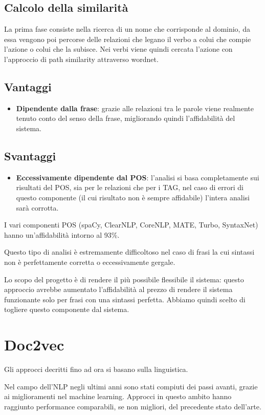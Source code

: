 \documentclass[twoside]{supsistudent}
\begin{document}
\subsection{Calcolo della similarità}
La prima fase consiste nella ricerca di un nome che corrisponde al dominio, da essa vengono poi percorse delle relazioni che legano il verbo a colui che compie l'azione o colui che la subisce. Nei verbi viene quindi cercata l'azione con l'approccio di path similarity attraverso wordnet.
\subsection{Vantaggi}
\begin{itemize}
  \item \textbf{Dipendente dalla frase}: grazie alle relazioni tra le parole viene realmente tenuto conto del senso della frase, migliorando quindi l'affidabilità del sistema.
\end{itemize}
\subsection{Svantaggi}
\begin{itemize}
  \item \textbf{Eccessivamente dipendente dal POS}: l'analisi si basa completamente sui risultati del POS, sia per le relazioni che per i TAG, nel caso di errori di questo componente (il cui risultato non è sempre affidabile) l'intera analisi sarà corrotta.
\end{itemize}
I vari componenti POS (spaCy, ClearNLP, CoreNLP, MATE, Turbo, SyntaxNet) hanno un'affidabilità intorno al 93\%\cite{POS_scores}.

Questo tipo di analisi è estremamente difficoltoso nel caso di frasi la cui sintassi non è perfettamente corretta o eccessivamente gergale.  

Lo scopo del progetto è di rendere il più possibile flessibile il sistema: questo approccio avrebbe aumentato l'affidabilità al prezzo di rendere il sistema funzionante solo per frasi con una sintassi perfetta. Abbiamo quindi scelto di togliere questo componente dal sistema.
\newpage
\section{Doc2vec}
Gli approcci decritti fino ad ora si basano sulla linguistica.

Nel campo dell'NLP negli ultimi anni sono stati compiuti dei passi avanti, grazie ai miglioramenti nel machine learning. Approcci in questo ambito hanno raggiunto performance comparabili, se non migliori, del precedente stato dell'arte. 
\end{document}
